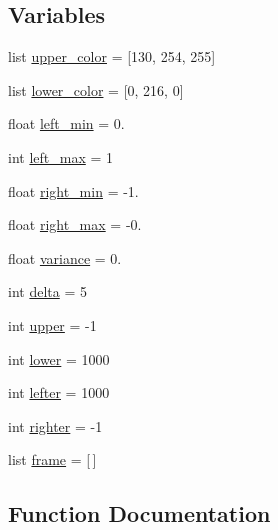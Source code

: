 \subsection*{Variables}
\begin{DoxyCompactItemize}
\item 
list \mbox{\hyperlink{namespacetoxic__vision_1_1lane__detector_aa1b547c10a2da901b93727a9e2d069be}{upper\+\_\+color}} = \mbox{[}130, 254, 255\mbox{]}
\item 
list \mbox{\hyperlink{namespacetoxic__vision_1_1lane__detector_afb4d5c2eb4ff5c30128774f99941786a}{lower\+\_\+color}} = \mbox{[}0, 216, 0\mbox{]}
\item 
float \mbox{\hyperlink{namespacetoxic__vision_1_1lane__detector_ac799a869f5eb8830039f61fb626fc82a}{left\+\_\+min}} = 0.
\item 
int \mbox{\hyperlink{namespacetoxic__vision_1_1lane__detector_addb36fd74f99c2788d7e153c8bf15de6}{left\+\_\+max}} = 1
\item 
float \mbox{\hyperlink{namespacetoxic__vision_1_1lane__detector_a1d19d5688abe600bc56eea89a9037084}{right\+\_\+min}} = -\/1.
\item 
float \mbox{\hyperlink{namespacetoxic__vision_1_1lane__detector_ad4a23b932ce65760f65729e50a2bdd7d}{right\+\_\+max}} = -\/0.
\item 
float \mbox{\hyperlink{namespacetoxic__vision_1_1lane__detector_a9b66066e6cda0deea6ece92c0f567c12}{variance}} = 0.
\item 
int \mbox{\hyperlink{namespacetoxic__vision_1_1lane__detector_a1829d358a957df5a0df24568e68ccc81}{delta}} = 5
\item 
int \mbox{\hyperlink{namespacetoxic__vision_1_1lane__detector_a0b6ffdfa9cdd7fc0dc9fbcf093f7be85}{upper}} = -\/1
\item 
int \mbox{\hyperlink{namespacetoxic__vision_1_1lane__detector_ae6e94ffeaf31d2adbfbd7d3919ed7f75}{lower}} = 1000
\item 
int \mbox{\hyperlink{namespacetoxic__vision_1_1lane__detector_af1171665614ff59f09a4fdb7505f145c}{lefter}} = 1000
\item 
int \mbox{\hyperlink{namespacetoxic__vision_1_1lane__detector_a2eaabc57b6e097c84cb0ab370d95b65e}{righter}} = -\/1
\item 
list \mbox{\hyperlink{namespacetoxic__vision_1_1lane__detector_a13998232e16bd76d1da86f068ac01230}{frame}} = \mbox{[}$\,$\mbox{]}
\end{DoxyCompactItemize}


\subsection{Function Documentation}
\mbox{\label{namespacetoxic__vision_1_1lane__detector_a7a56502e886845d86ce39e37d087b5a8}} 
